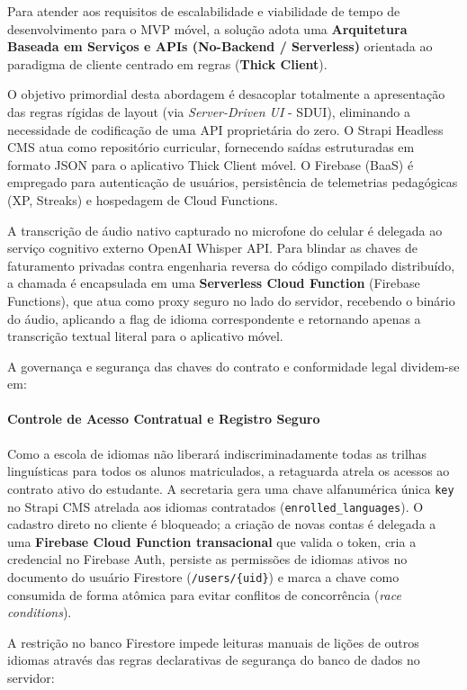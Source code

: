 \documentclass[portuguese]{sbcreviews-2025}%
\begin{document}
Para atender aos requisitos de escalabilidade e viabilidade de tempo de desenvolvimento para o MVP móvel, a solução adota uma \textbf{Arquitetura Baseada em Serviços e APIs (No-Backend / Serverless)} orientada ao paradigma de cliente centrado em regras (\textbf{Thick Client}).

O objetivo primordial desta abordagem é desacoplar totalmente a apresentação das regras rígidas de layout (via \textit{Server-Driven UI} - SDUI), eliminando a necessidade de codificação de uma API proprietária do zero. O Strapi Headless CMS atua como repositório curricular, fornecendo saídas estruturadas em formato JSON para o aplicativo Thick Client móvel. O Firebase (BaaS) é empregado para autenticação de usuários, persistência de telemetrias pedagógicas (XP, Streaks) e hospedagem de Cloud Functions. 

A transcrição de áudio nativo capturado no microfone do celular é delegada ao serviço cognitivo externo OpenAI Whisper API. Para blindar as chaves de faturamento privadas contra engenharia reversa do código compilado distribuído, a chamada é encapsulada em uma \textbf{Serverless Cloud Function} (Firebase Functions), que atua como proxy seguro no lado do servidor, recebendo o binário do áudio, aplicando a flag de idioma correspondente e retornando apenas a transcrição textual literal para o aplicativo móvel.

A governança e segurança das chaves do contrato e conformidade legal dividem-se em:

\paragraph{Controle de Acesso Contratual e Registro Seguro} Como a escola de idiomas não liberará indiscriminadamente todas as trilhas linguísticas para todos os alunos matriculados, a retaguarda atrela os acessos ao contrato ativo do estudante. A secretaria gera uma chave alfanumérica única \texttt{key} no Strapi CMS atrelada aos idiomas contratados (\verb|enrolled_languages|). O cadastro direto no cliente é bloqueado; a criação de novas contas é delegada a uma \textbf{Firebase Cloud Function transacional} que valida o token, cria a credencial no Firebase Auth, persiste as permissões de idiomas ativos no documento do usuário Firestore (\verb|/users/{uid}|) e marca a chave como consumida de forma atômica para evitar conflitos de concorrência (\textit{race conditions}).

A restrição no banco Firestore impede leituras manuais de lições de outros idiomas através das regras declarativas de segurança do banco de dados no servidor:
\end{document}
